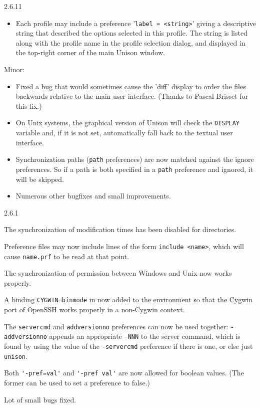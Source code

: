 \begin{changesfromversion}{2.6.11}
\begin{itemize}
\item Each profile may include a preference '\verb|label = <string>|' giving a
  descriptive string that described the options selected in this profile.
  The string is listed along with the profile name in the profile selection
  dialog, and displayed in the top-right corner of the main Unison window.
\end{itemize}

\item Minor:
\begin{itemize}
\item Fixed a bug that would sometimes cause the 'diff' display to order
  the files backwards relative to the main user interface.  (Thanks
  to Pascal Brisset for this fix.)
\item On Unix systems, the graphical version of Unison will check the
  \verb|DISPLAY| variable and, if it is not set, automatically fall back
  to the textual user interface.
\item Synchronization paths (\verb|path| preferences) are now matched
  against the ignore preferences.  So if a path is both specified in a
  \verb|path| preference and ignored, it will be skipped.
\item Numerous other bugfixes and small improvements.
\end{itemize}
\end{changesfromversion}

\begin{changesfromversion}{2.6.1}
\item The synchronization of modification times has been disabled for
  directories.

\item Preference files may now include lines of the form
  \verb+include <name>+, which will cause \verb+name.prf+ to be read
  at that point.

\item The synchronization of permission between Windows and Unix now
  works properly.

\item A binding \verb|CYGWIN=binmode| in now added to the environment
  so that the Cygwin port of OpenSSH works properly in a non-Cygwin
  context.

\item The \verb|servercmd| and \verb|addversionno| preferences can now
  be used together: \verb|-addversionno| appends an appropriate
  \verb+-NNN+ to the server command, which is found by using the value
  of the \verb|-servercmd| preference if there is one, or else just
  \verb|unison|.

\item Both \verb|'-pref=val'| and \verb|'-pref val'| are now allowed for
  boolean values.  (The former can be used to set a preference to false.)

\item Lot of small bugs fixed.
\end{changesfromversion}

